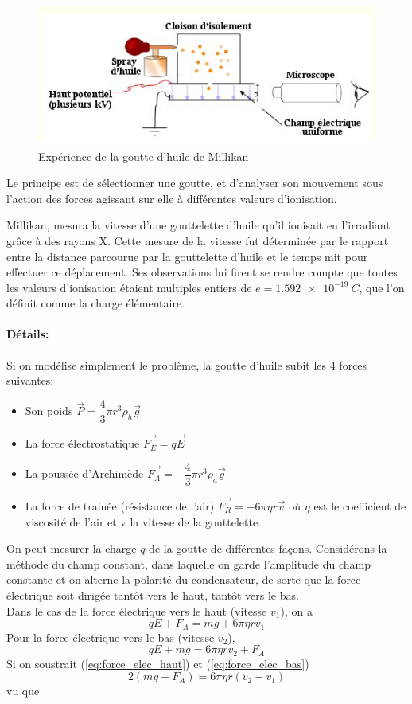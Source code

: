 \begin{figure}[ht]
    \centering
    \includegraphics[scale=0.60]{Images1/millikan.PNG}
    \caption{Expérience de la goutte d'huile de Millikan}
\end{figure}

Le principe est de sélectionner une goutte, et  d'analyser son mouvement sous l'action des forces agissant sur elle  à différentes valeurs d'ionisation.

Millikan, mesura la vitesse d'une gouttelette d'huile qu'il ionisait en l'irradiant grâce à des rayons X. Cette mesure de la vitesse fut déterminée par le rapport entre la distance parcourue par la gouttelette d'huile et le temps mit pour effectuer ce déplacement. Ses observations lui firent se rendre compte que toutes les valeurs d'ionisation étaient multiples entiers de $e=\SI{1.592e-19}{C}$, que l'on définit comme la charge élémentaire.

\paragraph{Détails:} Si on modélise simplement le problème, la goutte d'huile subit les 4 forces suivantes:
\begin{itemize}
    \item Son poids $\Vec{P}=\dfrac{4}{3}\pi r^3 \rho_h\Vec{g}$
    \item La force électrostatique $\Vec{F_E}=q\Vec{E}$
    \item La poussée d'Archimède $\Vec{F_A}=-\dfrac{4}{3}\pi r^3 \rho_a \Vec{g}$
    \item La force de trainée (résistance de l'air) $\Vec{F_R}=-6\pi\eta r\Vec{v}$ où $\eta$ est le coefficient de viscosité de l'air et v la vitesse de la gouttelette.
\end{itemize}
On peut mesurer la charge $q$ de la goutte de différentes façons. Considérons la méthode du champ constant, dans laquelle on garde l'amplitude du champ constante et on alterne la polarité du condensateur, de sorte que la force électrique soit dirigée tantôt vers le haut, tantôt vers le bas. \\[0,2cm]
Dans le cas de la force électrique vers le haut (vitesse $v_1$), on a
\begin{equation}
    qE+F_A = mg+6\pi\eta rv_1
    \label{eq:force_elec_haut}
\end{equation}
    Pour la force électrique vers le bas (vitesse $v_2$),
\begin{equation}
    qE+mg = 6\pi\eta rv_2 + F_A
    \label{eq:force_elec_bas}
\end{equation}
Si on soustrait (\ref{eq:force_elec_haut}) et (\ref{eq:force_elec_bas})
\[
    2(mg-F_A)=6\pi\eta r(v_2-v_1)
\]
vu que

